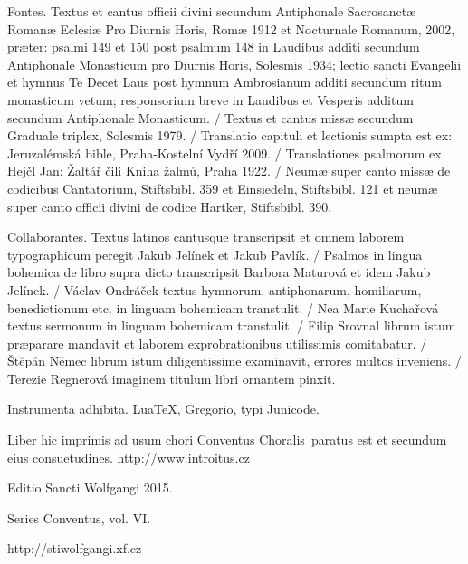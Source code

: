 \documentclass[a4paper, twoside, 12pt]{article}
\newcommand{\annusEditionis}{2015}
\begin{document}

\vfill
\pagebreak

\newpage
\RemoveSideThumbs
\pagestyle{empty}

\vfill

Fontes.
Textus et cantus officii divini secundum
Antiphonale Sacrosanctæ Romanæ Eclesiæ Pro Diurnis Horis, Romæ 1912
et Nocturnale Romanum, 2002, præter: psalmi 149 et 150 post
psalmum 148 in Laudibus additi secundum Antiphonale Monasticum pro Diurnis Horis,
Solesmis 1934; lectio sancti Evangelii et hymnus Te Decet Laus post hymnum
Ambrosianum additi secundum ritum monasticum vetum; responsorium breve
in Laudibus et Vesperis additum secundum Antiphonale Monasticum. /
Textus et cantus missæ secundum
Graduale triplex, Solesmis 1979. /
Translatio capituli et lectionis sumpta est ex:
Jeruzalémská bible, Praha-Kostelní Vydří 2009. /
Translationes psalmorum ex
Hejčl Jan: Žaltář čili Kniha žalmů, Praha 1922. /
Neumæ super canto missæ de codicibus Cantatorium, Stiftsbibl. 359 et Einsiedeln,
Stiftsbibl. 121 et neumæ super canto officii divini de codice Hartker,
Stiftsbibl. 390.

Collaborantes.
Textus latinos cantusque transcripsit et omnem laborem typographicum peregit
Jakub Jelínek et Jakub Pavlík. /
Psalmos in lingua bohemica de libro supra dicto transcripsit
Barbora Maturová et idem Jakub Jelínek. /
Václav Ondráček textus hymnorum, antiphonarum, homiliarum, benedictionum etc.
in linguam bohemicam transtulit. /
Nea Marie Kuchařová textus sermonum in linguam bohemicam transtulit. /
Filip Srovnal librum istum præparare mandavit et laborem exprobrationibus
utilissimis comitabatur. /
Štěpán Němec librum istum diligentissime examinavit, errores multos
inveniens. /
Terezie Regnerová imaginem titulum libri ornantem pinxit.

Instrumenta adhibita.
LuaTeX, %
Gregorio, %
typi Junicode. %

\begin{center}
Liber hic imprimis ad usum chori
\guillemotright Conventus Choralis\guillemotleft\
paratus est
et secundum eius consuetudines.
http://www.introitus.cz

\vfill

{\large Editio Sancti Wolfgangi \annusEditionis.}

\vfill

Series \guillemotright Conventus\guillemotleft, vol. VI.

\vfill

http://stiwolfgangi.xf.cz

\end{center}

\vfill
\end{document}
